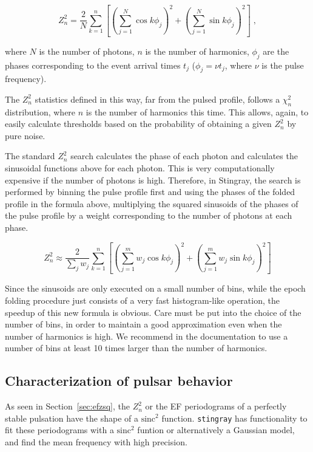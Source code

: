 \documentclass[twocolumn]{aastex62}
\newcommand{\zsq}{\ensuremath{Z^2_n}\xspace}
\newcommand{\stingray}{\texttt{stingray}\xspace}
\begin{document}
\begin{equation}
\zsq = \dfrac{2}{N} \sum_{k=1}^n \left[{\left(\sum_{j=1}^N \cos k \phi_j\right)}^2 + {\left(\sum_{j=1}^N \sin k \phi_j\right)}^2\right] \; ,
\end{equation}

\noindent where $N$ is the number of photons, $n$ is the number of harmonics, $\phi_j$ are the phases corresponding to the event arrival times $t_j$ ($\phi_j = \nu t_j$, where $\nu$ is the pulse frequency).

The \zsq statistics defined in this way, far from the pulsed profile, follows a $\chi^2_n$ distribution, where $n$ is the number of harmonics this time.
This allows, again, to easily calculate thresholds based on the probability of obtaining a given \zsq by pure noise.

The standard \zsq search calculates the phase of each photon and calculates the sinusoidal functions above for each photon.
This is very computationally expensive if the number of photons is high. 
Therefore, in Stingray, the search is performed by binning the pulse profile first and using the phases of the folded profile in the formula above, multiplying the squared sinusoids of the phases of the pulse profile by a weight corresponding to the number of photons at each phase.

\begin{equation}
\zsq \approx \dfrac{2}{\sum_j{w_j}} \sum_{k=1}^n \left[{\left(\sum_{j=1}^m w_j \cos k \phi_j\right)}^2 + {\left(\sum_{j=1}^m w_j \sin k \phi_j\right)}^2\right]
\end{equation}

Since the sinusoids are only executed on a small number of bins, while the epoch folding procedure just consists of a very fast histogram-like operation, the speedup of this new formula is obvious. 
Care must be put into the choice of the number of bins, in order to maintain a good approximation even when the number of harmonics is high. 
We recommend in the documentation to use a number of bins at least 10 times larger than the number of harmonics.

\subsection{Characterization of pulsar behavior}
\label{sec:ephem}
As seen in Section~\ref{sec:efzsq}, the \zsq or the EF periodograms of a perfectly stable pulsation have the shape of a $\mathrm{sinc}^2$ function.
\stingray has functionality to fit these periodograms with a $\mathrm{sinc}^2$ funtion or alternatively a Gaussian model, and find the mean frequency with high precision.
\end{document}
